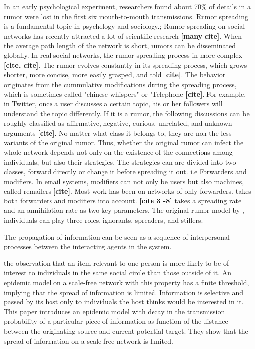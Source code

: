 \documentclass[envcountsame]{llncs}
\begin{document}
 \cite{zhang2013rumor} In an
early psychological experiment, researchers found about 70\% of details in a rumor were lost in the first six mouth-to-mouth transmissions. Rumor spreading is a fundamental topic in psychology and sociology.; Rumor spreading on social networks has recently attracted a lot of scientific research \textbf{[many cite]}. When the average path length of the network is short, rumors can be disseminated globally. In real social networks,  the rumor spreading process in more complex \textbf{[cite, cite]}. The rumor evolves constantly in its spreading process, which grows shorter, more concise, more easily grasped, and told \textbf{[cite]}. The behavior originates from the cummulative modifications during the spreading process, which is sometimes called "chinese whispers" or "Telephone \textbf{[cite]}. For example, in Twitter, once a user discusses a certain topic, his or her followers will understand the topic differently. If it is a rumor, the following discussions can be roughly classified as affirmative, negative, curious, unrelated, and unknown arguments \textbf{[cite]}. No matter what class it belongs to, they are non the less variants of the original rumor. Thus, whether the original rumor can infect the whole network depends not only on the existence of the connections among individuals, but also their strategies. The strategies can are divided into two classes, forward directly or change it before spreading it out. i.e Forwarders and modifiers. In email systems, modifiers can not only be users but also machines, called remailers \textbf{[cite]}. Most work has been on networks of only forwarders.  \cite{zhang2013rumor} takes both forwarders and modifiers into account. \textbf{[cite 3 -8]} takes a spreading rate and an annihilation rate as two key parameters. 
The original rumor model by \citep{daley1964epidemics}, individuals can play three roles, ignorants, spreaders, and stiflers. 
 
 \citep{agliari2006efficiency} The propagation of information can be seen as a sequence of interpersonal processes between the interacting agents in the system. 
 
\citep{wu2004information} the observation that an item
relevant to one person is more likely to be of interest to individuals in the same social circle than those outside of it. An epidemic model on a scale-free network with this property has a finite threshold, implying that the spread of information is limited. Information is selective and passed by its host only to individuals the host thinks would be interested in it. This paper introduces an epidemic model with decay in the transmission probability of a particular piece of information as function of the distance between the originating source and current potential target.  They show that the spread of information on a scale-free network is limited. 
\end{document}

